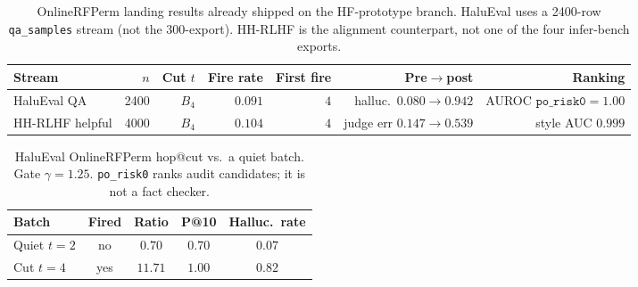 \begin{table}[ht]
\centering
\caption{OnlineRFPerm landing results already shipped on the HF-prototype branch.
HaluEval uses a 2400-row \texttt{qa\_samples} stream (not the 300-export).
HH-RLHF is the alignment counterpart, not one of the four infer-bench exports.}
\label{tab:infer-bench-onlinerfperm}
\small
\setlength{\tabcolsep}{3.5pt}
\begin{tabular}{@{}l r r r r r r@{}}
\toprule
Stream & $n$ & Cut $t$ & Fire rate & First fire & Pre$\to$post & Ranking \\
\midrule
HaluEval QA & 2400 & $B_{4}$ & $0.091$ & $4$ & halluc.\ $0.080\to0.942$ & AUROC $\texttt{po\_risk0}=1.00$ \\
HH-RLHF helpful & 4000 & $B_{4}$ & $0.104$ & $4$ & judge err $0.147\to0.539$ & style AUC $0.999$ \\
\bottomrule
\end{tabular}
\end{table}

\begin{table}[ht]
\centering
\caption{HaluEval OnlineRFPerm hop@cut vs.\ a quiet batch.
Gate $\gamma=1.25$. \texttt{po\_risk0} ranks audit candidates; it is not a fact checker.}
\label{tab:infer-bench-halu-hop}
\small
\begin{tabular}{@{}l c c c c@{}}
\toprule
Batch & Fired & Ratio & P@10 & Halluc.\ rate \\
\midrule
Quiet $t=2$ & no & $0.70$ & $0.70$ & $0.07$ \\
Cut $t=4$ & yes & $11.71$ & $1.00$ & $0.82$ \\
\bottomrule
\end{tabular}
\end{table}

